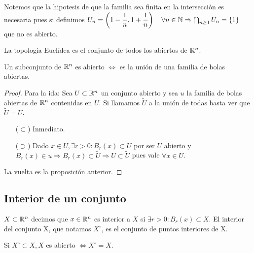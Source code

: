Notemos que la hipotesis de que la familia sea finita en la intersección es necesaria pues si definimos \(U_n = \left(1 - \dfrac{1}{n}, 1 + \dfrac{1}{n}\right) \quad \forall n \in \mathbb{N} \Rightarrow \bigcap_{n \geq 1} U_n = \{1\} \) que no es abierto.

\begin{definition}
  La topología Euclídea es el conjunto de todos los abiertos de \(\mathbb{R}^n\).
\end{definition}

\begin{corollary}
  Un subconjunto de \(\mathbb{R}^n\) es abierto \(\iff \) es la unión de una familia de bolas abiertas.
  \begin{proof}
    Para la ida: Sea \(U \subset \mathbb{R}^n\) un conjunto abierto y sea \(u\) la familia de bolas abiertas de \(\mathbb{R}^n\) contenidas en \(U\). Si llamamos \(\tilde{U} \) a la unión de todas basta ver que \(\tilde{U} = U\).\begin{itemize}
      \item[(\(\subset \))] Inmediato.
      \item[(\(\supset \))] Dado \(x \in U, \exists r > 0 : B_r(x) \subset U\) por ser \(U\) abierto y \(B_r(x) \in u \Rightarrow B_r(x) \subset \tilde{U} \Rightarrow U \subset \tilde{U} \) pues vale \(\forall x \in U\).
    \end{itemize}
    La vuelta es la proposición anterior.
  \end{proof}
\end{corollary}

\subsection{Interior de un conjunto}

\begin{definition}[Interior]
  \(X \subset \mathbb{R}^n\) decimos que \(x \in \mathbb{R}^n\) es interior a \(X\) si \(\exists r > 0 : B_r(x) \subset X\). El interior del conjunto X, que notamos \(X^{\circ} \), es el conjunto de puntos interiores de X.
\end{definition}

\begin{note}
  Si \(X^{\circ} \subset X, X\) es abierto \(\iff X^{\circ} = X\).
\end{note}

